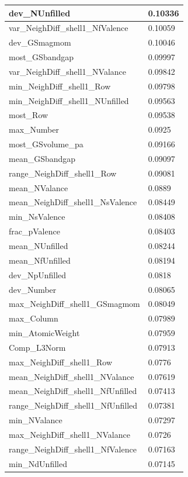 \begin{longtable}{|l|l|}
dev\_NUnfilled & 0.10336 \\ \hline
var\_NeighDiff\_shell1\_NfValence & 0.10059 \\ \hline
dev\_GSmagmom & 0.10046 \\ \hline
most\_GSbandgap & 0.09997 \\ \hline
var\_NeighDiff\_shell1\_NValance & 0.09842 \\ \hline
min\_NeighDiff\_shell1\_Row & 0.09798 \\ \hline
min\_NeighDiff\_shell1\_NUnfilled & 0.09563 \\ \hline
most\_Row & 0.09538 \\ \hline
max\_Number & 0.0925 \\ \hline
most\_GSvolume\_pa & 0.09166 \\ \hline
mean\_GSbandgap & 0.09097 \\ \hline
range\_NeighDiff\_shell1\_Row & 0.09081 \\ \hline
mean\_NValance & 0.0889 \\ \hline
mean\_NeighDiff\_shell1\_NsValence & 0.08449 \\ \hline
min\_NsValence & 0.08408 \\ \hline
frac\_pValence & 0.08403 \\ \hline
mean\_NUnfilled & 0.08244 \\ \hline
mean\_NfUnfilled & 0.08194 \\ \hline
dev\_NpUnfilled & 0.0818 \\ \hline
dev\_Number & 0.08065 \\ \hline
max\_NeighDiff\_shell1\_GSmagmom & 0.08049 \\ \hline
max\_Column & 0.07989 \\ \hline
min\_AtomicWeight & 0.07959 \\ \hline
Comp\_L3Norm & 0.07913 \\ \hline
max\_NeighDiff\_shell1\_Row & 0.0776 \\ \hline
mean\_NeighDiff\_shell1\_NValance & 0.07619 \\ \hline
mean\_NeighDiff\_shell1\_NfUnfilled & 0.07413 \\ \hline
range\_NeighDiff\_shell1\_NfUnfilled & 0.07381 \\ \hline
min\_NValance & 0.07297 \\ \hline
max\_NeighDiff\_shell1\_NValance & 0.0726 \\ \hline
range\_NeighDiff\_shell1\_NfValence & 0.07163 \\ \hline
min\_NdUnfilled & 0.07145 \\ \hline

\end{longtable}

